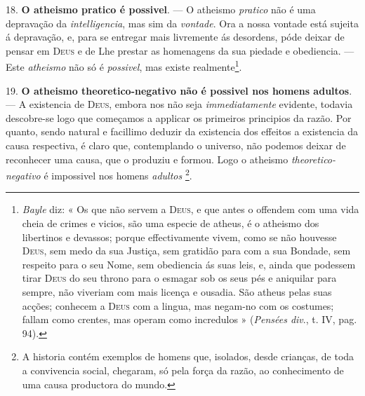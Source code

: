  18. \textbf{O atheismo pratico é possivel}. --- O atheismo \emph{pratico} não é uma depravação da \emph{intelligencia}, mas sim da \emph{vontade}. Ora a nossa vontade está sujeita á depravação, e, para se entregar mais livremente ás desordens, póde deixar de pensar em \textsc{Deus} e de Lhe prestar as homenagens da sua piedade e obediencia. --- Este \emph{atheismo} não só é \emph{possivel}, mas existe realmente\footnote{\emph{Bayle} diz: « Os que não servem a \textsc{Deus}, e que antes o offendem com uma vida cheia de crimes e vicios, são uma especie de atheus, é o atheismo dos libertinos e devassos; porque effectivamente vivem, como se não houvesse \textsc{Deus}, sem medo da sua Justiça, sem gratidão para com a sua Bondade, sem respeito para o seu Nome, sem obediencia ás suas leis, e, ainda que podessem tirar \textsc{Deus} do seu throno para o esmagar sob os seus pés e aniquilar para sempre, não viveriam com mais licença e ousadia. São atheus pelas suas acções; conhecem a \textsc{Deus} com a lingua, mas negam-no com os costumes; fallam como crentes, mas operam como incredulos » (\emph{Pensées div}., t. IV, pag. 94).}.

19. \textbf{O atheismo theoretico-negativo não é possivel nos homens adultos}. --- A existencia de \textsc{Deus}, embora nos não seja \emph{immediatamente} evidente, todavia descobre-se logo que começamos a applicar os primeiros principios da razão. Por quanto, sendo natural e facillimo deduzir da existencia dos effeitos a existencia da causa respectiva, é claro que, contemplando o universo, não podemos deixar de reconhecer uma causa, que o   produziu e formou. Logo o atheismo \emph{theoretico-negativo} é impossivel nos homens \emph{adultos} \footnote{A historia contém exemplos de homens que, isolados, desde crianças, de toda a convivencia social, chegaram, só pela força da razão, ao conhecimento de uma causa productora do mundo.}.

